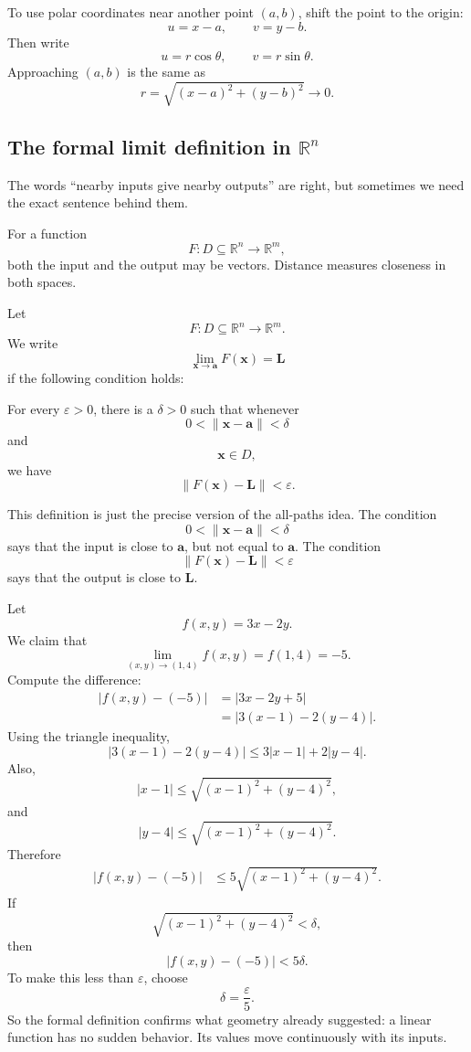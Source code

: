 To use polar coordinates near another point \((a,b)\), shift the point to the origin:
\[
    u=x-a,\qquad v=y-b.
\]
Then write
\[
    u=r\cos\theta,\qquad v=r\sin\theta.
\]
Approaching \((a,b)\) is the same as
\[
    r=\sqrt{(x-a)^2+(y-b)^2}\to0.
\]

\subsection{The formal limit definition in \texorpdfstring{\(\mathbb R^n\)}{Rn}}

The words ``nearby inputs give nearby outputs'' are right, but sometimes we need the
exact sentence behind them.

For a function
\[
    F:D\subseteq\mathbb R^n\to\mathbb R^m,
\]
both the input and the output may be vectors.  Distance measures closeness in both
spaces.

\begin{definition}
Let
\[
    F:D\subseteq\mathbb R^n\to\mathbb R^m.
\]
We write
\[
\boxed{
    \lim_{\mathbf x\to\mathbf a}F(\mathbf x)=\mathbf L
}
\]
if the following condition holds:

For every \(\varepsilon>0\), there is a \(\delta>0\) such that whenever
\[
    0<\|\mathbf x-\mathbf a\|<\delta
\]
and
\[
    \mathbf x\in D,
\]
we have
\[
    \|F(\mathbf x)-\mathbf L\|<\varepsilon.
\]
\end{definition}

This definition is just the precise version of the all-paths idea.  The condition
\[
    0<\|\mathbf x-\mathbf a\|<\delta
\]
says that the input is close to \(\mathbf a\), but not equal to \(\mathbf a\).  The condition
\[
    \|F(\mathbf x)-\mathbf L\|<\varepsilon
\]
says that the output is close to \(\mathbf L\).

\begin{example}
Let
\[
    f(x,y)=3x-2y.
\]
We claim that
\[
    \lim_{(x,y)\to(1,4)} f(x,y)=f(1,4)=-5.
\]
Compute the difference:
\[
\begin{aligned}
    |f(x,y)-(-5)|
    &=
    |3x-2y+5|  \\
    &=
    |3(x-1)-2(y-4)|.
\end{aligned}
\]
Using the triangle inequality,
\[
    |3(x-1)-2(y-4)|
    \le
    3|x-1|+2|y-4|.
\]
Also,
\[
    |x-1|\le \sqrt{(x-1)^2+(y-4)^2},
\]
and
\[
    |y-4|\le \sqrt{(x-1)^2+(y-4)^2}.
\]
Therefore
\[
\begin{aligned}
    |f(x,y)-(-5)|
    &\le
    5\sqrt{(x-1)^2+(y-4)^2}.
\end{aligned}
\]
If
\[
    \sqrt{(x-1)^2+(y-4)^2}<\delta,
\]
then
\[
    |f(x,y)-(-5)|<5\delta.
\]
To make this less than \(\varepsilon\), choose
\[
    \delta=\frac{\varepsilon}{5}.
\]
So the formal definition confirms what geometry already suggested: a linear function
has no sudden behavior.  Its values move continuously with its inputs.
\end{example}

